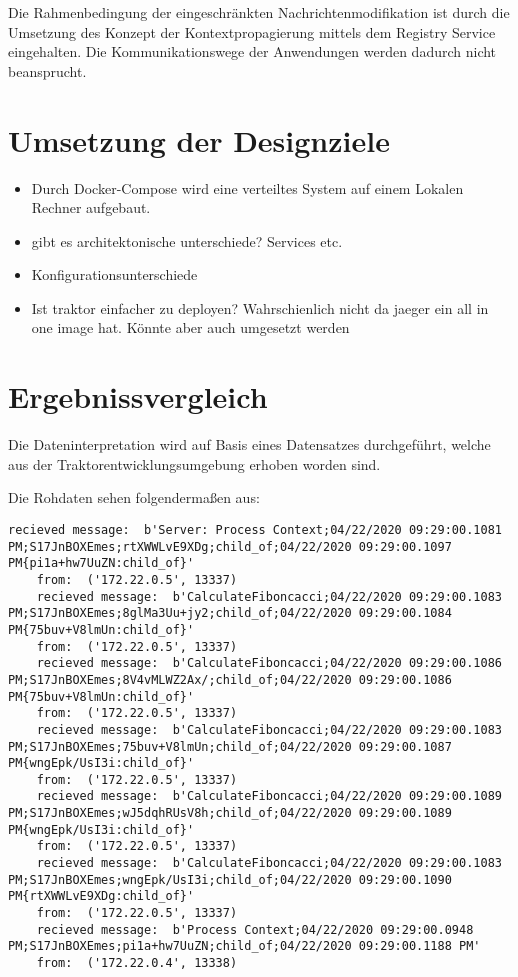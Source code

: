 Die Rahmenbedingung der eingeschränkten Nachrichtenmodifikation ist durch die Umsetzung des Konzept der Kontextpropagierung mittels dem Registry Service eingehalten. Die Kommunikationswege der Anwendungen werden dadurch nicht beansprucht.


\section{Umsetzung der Designziele}
\label{section:Umsetzung der Designziele}
\begin{itemize}
	\item Durch Docker-Compose wird eine verteiltes System auf einem Lokalen Rechner aufgebaut.
	\item gibt es architektonische unterschiede? Services etc. 
	\item Konfigurationsunterschiede
	\item Ist traktor einfacher zu deployen? Wahrschienlich nicht da jaeger ein all in one image hat. Könnte aber auch umgesetzt werden
\end{itemize}
\section{Ergebnissvergleich}
\label{section:Ergebnissvergleich}
Die Dateninterpretation wird auf Basis eines Datensatzes durchgeführt, welche aus der Traktorentwicklungsumgebung erhoben worden sind. 

Die Rohdaten sehen folgendermaßen aus:
\begin{minipage}[]{\textwidth}
	\begin{lstlisting}[frame=trBL]
	recieved message:  b'Server: Process Context;04/22/2020 09:29:00.1081 PM;S17JnBOXEmes;rtXWWLvE9XDg;child_of;04/22/2020 09:29:00.1097 PM{pi1a+hw7UuZN:child_of}'
	from:  ('172.22.0.5', 13337)
	recieved message:  b'CalculateFiboncacci;04/22/2020 09:29:00.1083 PM;S17JnBOXEmes;8glMa3Uu+jy2;child_of;04/22/2020 09:29:00.1084 PM{75buv+V8lmUn:child_of}'
	from:  ('172.22.0.5', 13337)
	recieved message:  b'CalculateFiboncacci;04/22/2020 09:29:00.1086 PM;S17JnBOXEmes;8V4vMLWZ2Ax/;child_of;04/22/2020 09:29:00.1086 PM{75buv+V8lmUn:child_of}'
	from:  ('172.22.0.5', 13337)
	recieved message:  b'CalculateFiboncacci;04/22/2020 09:29:00.1083 PM;S17JnBOXEmes;75buv+V8lmUn;child_of;04/22/2020 09:29:00.1087 PM{wngEpk/UsI3i:child_of}'
	from:  ('172.22.0.5', 13337)
	recieved message:  b'CalculateFiboncacci;04/22/2020 09:29:00.1089 PM;S17JnBOXEmes;wJ5dqhRUsV8h;child_of;04/22/2020 09:29:00.1089 PM{wngEpk/UsI3i:child_of}'
	from:  ('172.22.0.5', 13337)
	recieved message:  b'CalculateFiboncacci;04/22/2020 09:29:00.1083 PM;S17JnBOXEmes;wngEpk/UsI3i;child_of;04/22/2020 09:29:00.1090 PM{rtXWWLvE9XDg:child_of}'
	from:  ('172.22.0.5', 13337)
	recieved message:  b'Process Context;04/22/2020 09:29:00.0948 PM;S17JnBOXEmes;pi1a+hw7UuZN;child_of;04/22/2020 09:29:00.1188 PM'
	from:  ('172.22.0.4', 13338)
	\end{lstlisting}
	\label{listing:Tracerrohdaten aus der Traktorentwicklungsumgebung}
\end{minipage}

